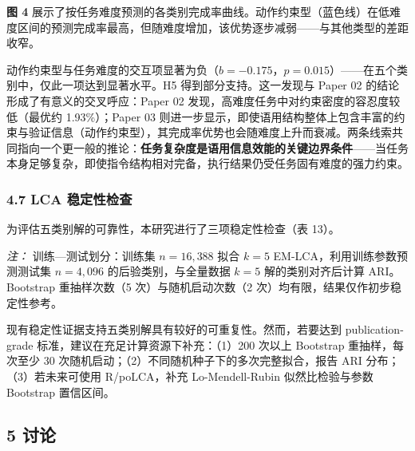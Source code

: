 \documentclass[12pt,a4paper,openany,oneside]{ctexrep}
\begin{document}
\textbf{图 4} 展示了按任务难度预测的各类别完成率曲线。动作约束型（蓝色线）在低难度区间的预测完成率最高，但随难度增加，该优势逐步减弱——与其他类型的差距收窄。

动作约束型与任务难度的交互项显著为负（$b=-0.175$，$p=0.015$）——在五个类别中，仅此一项达到显著水平。H5 得到部分支持。这一发现与 Paper 02 的结论形成了有意义的交叉呼应：Paper 02 发现，高难度任务中对约束密度的容忍度较低（最优约 1.93\%）；Paper 03 则进一步显示，即使语用结构整体上包含丰富的约束与验证信息（动作约束型），其完成率优势也会随难度上升而衰减。两条线索共同指向一个更一般的推论：\textbf{任务复杂度是语用信息效能的关键边界条件}——当任务本身足够复杂，即使指令结构相对完备，执行结果仍受任务固有难度的强力约束。

\subsubsection{4.7 LCA 稳定性检查}


为评估五类别解的可靠性，本研究进行了三项稳定性检查（表 13）。


\begin{table}[htbp]
\centering
\caption{表 13：LCA 稳定性检查汇总}
\small
{}
\end{table}

\emph{注：} 训练—测试划分：训练集 $n=16{,}388$ 拟合 $k=5$ EM-LCA，利用训练参数预测测试集 $n=4{,}096$ 的后验类别，与全量数据 $k=5$ 解的类别对齐后计算 ARI。Bootstrap 重抽样次数（5 次）与随机启动次数（2 次）均有限，结果仅作初步稳定性参考。

现有稳定性证据支持五类别解具有较好的可重复性。然而，若要达到 publication-grade 标准，建议在充足计算资源下补充：（1）200 次以上 Bootstrap 重抽样，每次至少 30 次随机启动；（2）不同随机种子下的多次完整拟合，报告 ARI 分布；（3）若未来可使用 R/poLCA，补充 Lo-Mendell-Rubin 似然比检验与参数 Bootstrap 置信区间。

\subsection{5 讨论}
\end{document}
